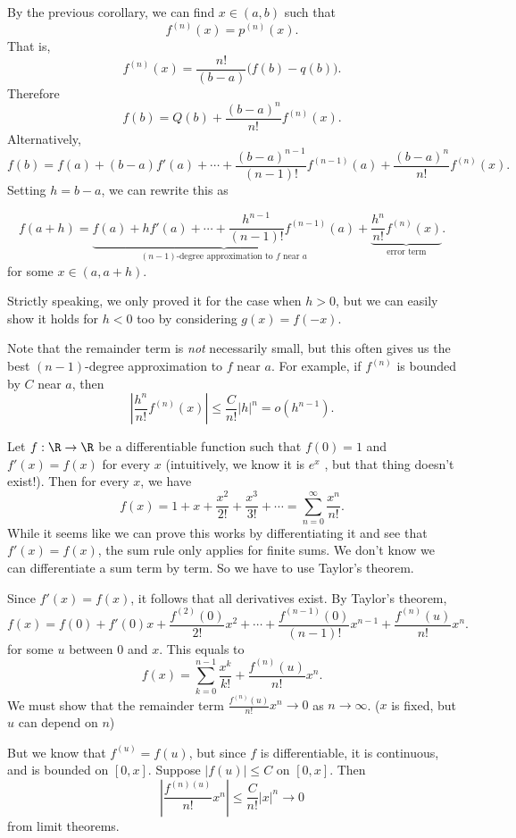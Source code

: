 \documentclass[a4paper]{article}
\begin{document}
By the previous corollary, we can find $x\in (a, b)$ such that
\[
  f^{(n)}(x) = p^{(n)}(x).
\]
That is,
\[
  f^{(n)}(x) = \frac{n!}{(b - a)}\big(f(b) - q(b)\big).
\]
Therefore
\[
  f(b) = Q(b) + \frac{(b - a)^n}{n!}f^{(n)}(x).
\]
Alternatively,
\[
  f(b) = f(a) + (b - a)f'(a) + \cdots + \frac{(b - a)^{n - 1}}{(n- 1)!}f^{(n - 1)}(a) + \frac{(b - a)^n}{n!}f^{(n)}(x).
\]
Setting $h = b - a$, we can rewrite this as
\begin{thm}
  \[
    f(a + h) = \underbrace{f(a) + hf'(a) + \cdots + \frac{h^{n - 1}}{(n - 1)!}f^{(n - 1)}(a)}_{(n - 1)\text{-degree approximation to }f\text{ near }a} + \underbrace{\frac{h^n}{n!}f^{(n)}(x)}_{\text{error term}}.
  \]
  for some $x\in (a, a + h)$.

  \note Strictly speaking, we only proved it for the case when $h > 0$, but we can easily show it holds for $h < 0$ too by considering $g(x) = f(-x)$.
\end{thm}
Note that the remainder term is \emph{not} necessarily small, but this often gives us the best $(n - 1)$-degree approximation to $f$ near $a$. For example, if $f^{(n)}$ is bounded by $C$ near $a$, then
\[
  \left|\frac{h^n}{n!}f^{(n)}(x)\right| \leq \frac{C}{n!}|h|^n = o(h^{n - 1}).
\]

\begin{eg}
  Let $f: \R \to \R$ be a differentiable function such that $f(0) = 1$ and $f'(x) = f(x)$ for every $x$ (intuitively, we know it is $e^x$ , but that thing doesn't exist!). Then for every $x$, we have
  \[
    f(x) = 1 + x + \frac{x^2}{2!} + \frac{x^3}{3!} + \cdots = \sum_{n = 0}^\infty \frac{x^n}{n!}.
  \]
  While it seems like we can prove this works by differentiating it and see that $f'(x) = f(x)$, the sum rule only applies for finite sums. We don't know we can differentiate a sum term by term. So we have to use Taylor's theorem.

  Since $f'(x) =f(x)$, it follows that all derivatives exist. By Taylor's theorem,
  \[
    f(x) = f(0) + f'(0) x + \frac{f^{(2)}(0)}{2!}x^2 + \cdots + \frac{f^{(n - 1)}(0)}{(n - 1)!}x^{n - 1} + \frac{f^{(n)}(u)}{n!}x^n.
  \]
  for some $u$ between $0$ and $x$. This equals to
  \[
    f(x) = \sum_{k = 0}^{n - 1}\frac{x^k}{k!} + \frac{f^{(n)}(u)}{n!}x^n.
  \]
  We must show that the remainder term $\frac{f^{(n)}(u)}{n!}x^n \to 0$ as $n \to \infty$. (\note $x$ is fixed, but $u$ can depend on $n$)

  But we know that $f^{(u)} = f(u)$, but since $f$ is differentiable, it is continuous, and is bounded on $[0, x]$. Suppose $|f(u)| \leq C$ on $[0, x]$. Then
  \[
    \left|\frac{f^{(n)(u)}}{n!}x^n\right| \leq \frac{C}{n!}|x|^n \to 0
  \]
  from limit theorems.
\end{eg}
\end{document}
